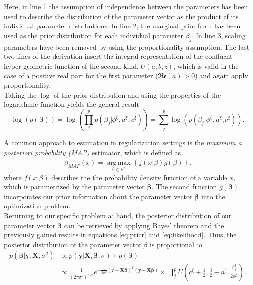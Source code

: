 \documentclass[12pt,a4paper]{article}
\DeclareMathOperator*{\argmax}{arg\,max}
\begin{document}
Here, in line 1 the assumption of independence between the parameters has been used to describe the distribution of the parameter vector as the product of its individual parameter distributions. In line 2, the marginal prior from \textcite{TGP2020} has been used as the prior distribution for each individual parameter $\beta_j$. In line 3, scaling parameters have been removed by using the proportionality assumption. The last two lines of the derivation insert the integral representation of the confluent hyper-geometric function of the second kind, $U(a,b,z)$, which is valid in the case of a positive real part for the first parameter ($\mathfrak{Re}(a) > 0$) and again apply proportionality.\\

Taking the $\log$ of the prior distribution and using the properties of the logarithmic function yields the general result
\[
\log(p(\mathbf{\beta}))=\log(\prod_j^p p(\beta_j|\phi^\xi, a^\xi, c^\xi))=\sum_j^p \log(p(\beta_j|\phi^\xi, a^\xi, c^\xi)).
\]

A common approach to estimation in regularization settings is the \textit{maximum a posteriori probability (MAP)} estimator, which is defined as
\[
\hat{\beta}_{MAP}(x) = \underset{\beta \in \mathbb{R}^p}{\argmax}\left\{f(x|\beta)g(\beta)\right\}.
\]
where $f(x|\beta)$ describes the the probability density function of a variable $x$, which is parametrized by the parameter vector $\mathbf{\beta}$. The second function $g(\mathbf{\beta})$ incorporates our prior information about the parameter vector $\mathbf{\beta}$ into the optimization problem.\\  

Returning to our specific problem at hand, the posterior distribution of our parameter vector $\mathbf{\beta}$ can be retrieved by applying Bayes' theorem and the previously gained results in equations \ref{eq:prior} and \ref{eq:likelihood}. Thus, the posterior distribution of the parameter vector $\beta$ is proportional to
\begin{align}
p(\mathbf{\beta}|\mathbf{y}, \mathbf{X}, \sigma^2) 	&\propto p(\mathbf{y}|\mathbf{X},\mathbf{\beta},\sigma)\times p(\mathbf{\beta}) \nonumber\\
						&\propto \frac{1}{(2\pi\sigma^2)^{n/2}}e^{-\frac{1}{2\sigma^2}(\mathbf{y}-\mathbf{X}\mathbf{\beta})^T(\mathbf{y}-\mathbf{X}\mathbf{\beta})} \times \prod_j^p U\left(c^\xi + \frac{1}{2}, \frac{3}{2}-a^\xi, \frac{\beta_j^2}{2\phi^\xi}\right).\label{eq:posterior}
\end{align} 
\end{document}

